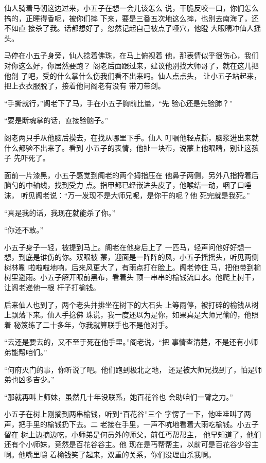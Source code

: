 仙人骑着马朝这边过来，小五子在想一会儿该怎么
说，干脆反咬一口，你们怎么搞的，正睡得香呢，被你们摔
下来，要是三番五次地这么摔，也别去南海了，还不如直
接杀了我。话都想好了，忽然记起自己被点了哑穴，他瞪
大眼睛冲仙人摇头。

马停在小五子身旁，仙人捻着佛珠，在马上俯视着
他，那表情似乎很伤心，我们对你这么好，你居然要跑？
阁老后面跟过来，建议他别找大师哥了，就在这儿把他剖
了吧，受的什么掌什么伤我们看不出来吗。仙人点点头，
让小五子站起来，把上衣衣服脱了，接着他问阁老有没有
带刀带剑。

“手撕就行，”阁老下了马，手在小五子胸前比量，“先
验心还是先验肺？”

“要是断魂掌的话，直接验脑子。”

阁老两只手从他脑后摸去，在找从哪里下手。仙人
叮嘱他轻点撕，脑浆迸出来就什么都验不出来了。看到
小五子的表情，他扯一块布，说蒙上他眼睛，别让这孩子
先吓死了。

面前一片漆黑，小五子感觉到阁老的两个拇指压在
他鼻子两侧，另外八指捋着后脑勺的中轴线，找到受力
点。指甲都已经嵌进头皮了，他喉结一动，咽了口唾沫，
听见阁老说：“万一发现不是大师兄呢，是你干的呢？他
死完就是我死。”

“真是我的话，我现在就能杀了你。”

“你还不敢。”

小五子身子一轻，被提到马上。阁老在他身后上了
一匹马，轻声问他好好想一想，到底是谁伤的你。双眼被
蒙，迎面是一阵阵的风，小五子摇摇头，听见两侧树林唰
啦啦啦地响，后来风更大了，有雨点打在脸上。阁老停住
马，把他带到榆树里避雨。小五子解开眼前黑布，看着头
顶一串串的榆钱流口水。他爬上树干，让阁老递他一根
杆子打榆钱。

后来仙人也到了，两个老头并排坐在树下的大石头
上等雨停，被打碎的榆钱从树上飘落下来。仙人手捻佛
珠说，我一度还以为是你，如果真是大师兄偷的，他照着
秘笈练了二十多年，你我就算联手也不是他对手。

“去还是要去的，又不至于死在他手里。”阁老说，“把
事情查清楚，不是还有小师弟能帮咱们。”

“何府灭门的事，你听说了吧。他们跑到极北之地，
还是被大师兄找到了，怕是师弟也凶多吉少。”

“那就再叫上师妹，虽然几十年没联系，她百花谷也
会助咱们一臂之力。”

小五子在树上刚摘到两串榆钱，听到“百花谷”三个
字愣了一下，他哇哇叫了两声，把手里的榆钱扔下去。二
老接在手里，一声不吭地看着大雨吃榆钱。小五子留在
树上边摘边吃，小师弟是何员外的师父，前任丐帮帮主，
他早知道了，他们还有个小师妹，竞然是百花谷谷主。他
现在是丐帮帮主，以前可是百花谷少谷主啊。他嘴里嚼
着榆钱笑了起来，双重的关系，你们没理由杀我啊。

